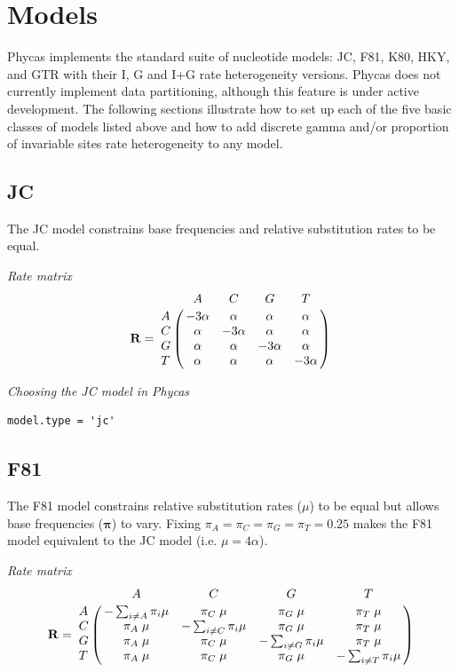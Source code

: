 \documentclass[10pt]{article}
\newcommand{\Rii}[1]{-\sum_{i \neq #1} \pi_i \mu}
\begin{document}
\section{Models}\label{sec:models}

Phycas implements the standard suite of nucleotide models: JC, F81, K80, HKY, and GTR with their I, G and I+G rate heterogeneity versions. Phycas does not currently implement data partitioning, although this feature is under active development. The following sections illustrate how to set up each of the five basic classes of models listed above and how to add discrete gamma and/or proportion of invariable sites rate heterogeneity to any model.

\subsection{JC}
The JC model \citep{JukesCantor1969} constrains base frequencies and relative substitution rates to be equal.

{\large \em Rate matrix}
$${\bf R} = \bordermatrix{ &     A     &     C     &     G     &   T       \cr
                         A & -3 \alpha &  \alpha   &  \alpha   &  \alpha   \cr
                         C &  \alpha   & -3 \alpha &  \alpha   &  \alpha   \cr
                         G &  \alpha   &  \alpha   & -3 \alpha &  \alpha   \cr
                         T &  \alpha   &  \alpha   &  \alpha   & -3 \alpha \cr}$$

{\large \em Choosing the JC model in Phycas}
\begin{verbatim}
model.type = 'jc'
\end{verbatim}

\subsection{F81}

The F81 model \citep{Felsenstein1981} constrains relative substitution rates ($\mu$) to be equal but allows base frequencies ($\bm \pi$) to vary. Fixing $\pi_A = \pi_C = \pi_G = \pi_T = 0.25$ makes the F81 model equivalent to the JC model (i.e. $\mu = 4 \alpha$).

{\large \em Rate matrix}
$${\bf R} = \bordermatrix{ &       A      &       C       &       G       &       T       \cr
                         A &    \Rii{A}   & \pi_C \; \mu  & \pi_G \; \mu  & \pi_T \; \mu  \cr
                         C & \pi_A \; \mu &    \Rii{C}    & \pi_G \; \mu  & \pi_T \; \mu  \cr
                         G & \pi_A \; \mu & \pi_C \; \mu  &    \Rii{G}    & \pi_T \; \mu  \cr
                         T & \pi_A \; \mu & \pi_C \; \mu  & \pi_G \; \mu  &     \Rii{T}   \cr}$$                                                         
\end{document}
